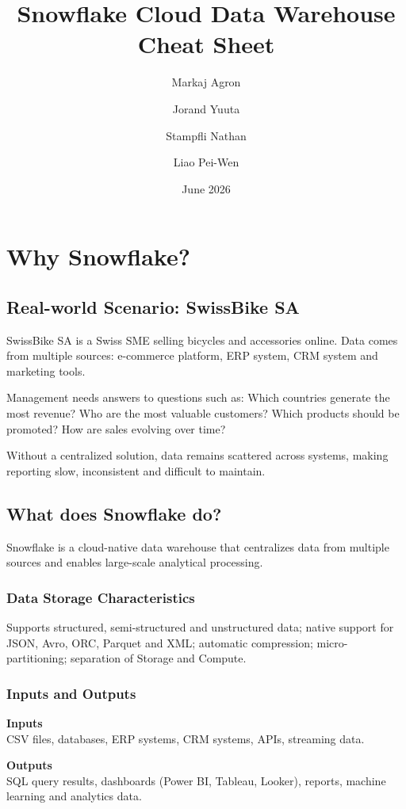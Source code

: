 \documentclass[9pt,a4paper]{article}
\title{\vspace{-1cm}Snowflake Cloud Data Warehouse Cheat Sheet}
\author{Markaj Agron \and Jorand Yuuta \and Stampfli Nathan \and Liao Pei-Wen}
\date{June 2026}
\begin{document}
\maketitle
\vspace{-1cm}

\section{Why Snowflake?}

\subsection{Real-world Scenario: SwissBike SA}

SwissBike SA is a Swiss SME selling bicycles and accessories online. Data comes from multiple sources: e-commerce platform, ERP system, CRM system and marketing tools.

Management needs answers to questions such as: Which countries generate the most revenue? Who are the most valuable customers? Which products should be promoted? How are sales evolving over time?

Without a centralized solution, data remains scattered across systems, making reporting slow, inconsistent and difficult to maintain.

\subsection{What does Snowflake do?}

Snowflake is a cloud-native data warehouse that centralizes data from multiple sources and enables large-scale analytical processing.

\subsubsection{Data Storage Characteristics}

Supports structured, semi-structured and unstructured data; native support for JSON, Avro, ORC, Parquet and XML; automatic compression; micro-partitioning; separation of Storage and Compute.

\subsubsection{Inputs and Outputs}

\begin{minipage}[t]{0.47\columnwidth}
\textbf{Inputs}\\
CSV files, databases, ERP systems, CRM systems, APIs, streaming data.
\end{minipage}
\hfill
\begin{minipage}[t]{0.47\columnwidth}
\textbf{Outputs}\\
SQL query results, dashboards (Power BI, Tableau, Looker), reports, machine learning and analytics data.
\end{minipage}
\end{document}
